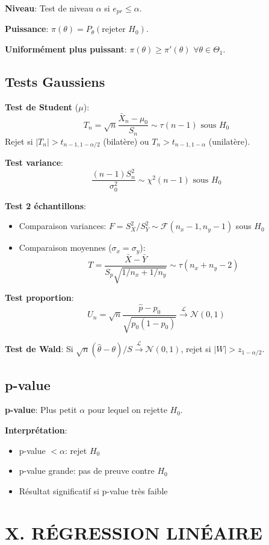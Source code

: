 \documentclass[8pt,twocolumn]{article}
\newcommand{\mydef}[1]{\textcolor{defcolor}{\textbf{#1}}}
\newcommand{\myprop}[1]{\textcolor{propcolor}{\textbf{#1}}}
\newcommand{\myrem}[1]{\textcolor{remcolor}{\textbf{#1}}}
\begin{document}
\mydef{Niveau}: Test de niveau $\alpha$ si $e_{pr} \leq \alpha$.

\mydef{Puissance}: $\pi(\theta)=P_\theta(\text{rejeter }H_0)$.

\mydef{Uniformément plus puissant}: $\pi(\theta) \geq \pi'(\theta)$ $\forall\theta\in\Theta_1$.

\subsection{Tests Gaussiens}
\myprop{Test de Student} ($\mu$):
$$T_n=\sqrt{n}\frac{\bar{X}_n-\mu_0}{S_n} \sim \tau(n-1) \text{ sous }H_0$$
Rejet si $|T_n| > t_{n-1,1-\alpha/2}$ (bilatère) ou $T_n > t_{n-1,1-\alpha}$ (unilatère).

\myprop{Test variance}:
$$\frac{(n-1)S_n^2}{\sigma_0^2} \sim \chi^2(n-1) \text{ sous }H_0$$

\myprop{Test 2 échantillons}:
\begin{itemize}[nosep]
\item Comparaison variances: $F=S_X^2/S_Y^2 \sim \mathcal{F}(n_x-1,n_y-1)$ sous $H_0$
\item Comparaison moyennes ($\sigma_x=\sigma_y$): 
$$T=\frac{\bar{X}-\bar{Y}}{S_p\sqrt{1/n_x+1/n_y}} \sim \tau(n_x+n_y-2)$$
\end{itemize}

\myprop{Test proportion}: 
$$U_n=\sqrt{n}\frac{\hat{p}-p_0}{\sqrt{p_0(1-p_0)}} \xrightarrow{\mathcal{L}} \mathcal{N}(0,1)$$

\myprop{Test de Wald}: Si $\sqrt{n}(\hat{\theta}-\theta)/S \xrightarrow{\mathcal{L}} \mathcal{N}(0,1)$, rejet si $|W|>z_{1-\alpha/2}$.

\subsection{p-value}
\mydef{p-value}: Plus petit $\alpha$ pour lequel on rejette $H_0$.

\myrem{Interprétation}:
\begin{itemize}[nosep]
\item p-value $< \alpha$: rejet $H_0$
\item p-value grande: pas de preuve contre $H_0$
\item Résultat significatif si p-value très faible
\end{itemize}

\section*{\mydef{X. RÉGRESSION LINÉAIRE}}
\end{document}
